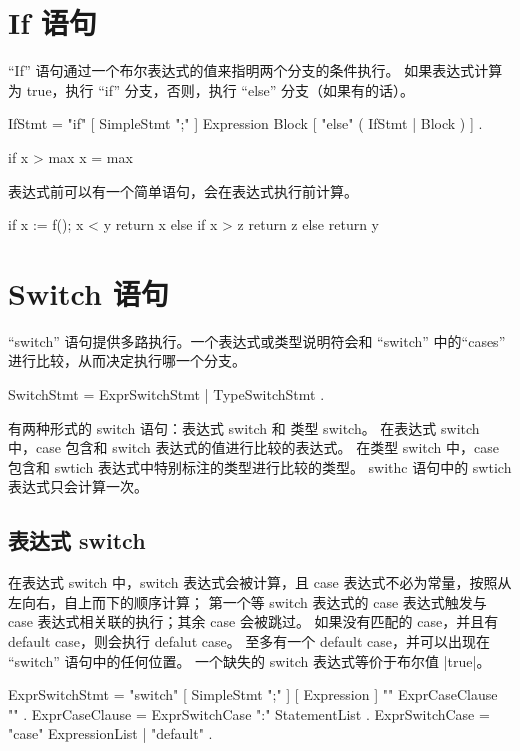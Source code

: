 \section{If 语句}
``If'' 语句通过一个布尔表达式的值来指明两个分支的条件执行。
如果表达式计算为 true，执行 ``if'' 分支，否则，执行 ``else'' 分支（如果有的话）。
\begin{EBNF}
IfStmt = "if" [ SimpleStmt ";" ] Expression Block [ "else" ( IfStmt | Block ) ] .
\end{EBNF}

\begin{golang}
if x > max {
	x = max
}
\end{golang}

表达式前可以有一个简单语句，会在表达式执行前计算。
\begin{golang}
if x := f(); x < y {
	return x
} else if x > z {
	return z
} else {
	return y
}
\end{golang}

\section{Switch 语句}
``switch'' 语句提供多路执行。一个表达式或类型说明符会和 ``switch'' 中的``cases'' 进行比较，从而决定执行哪一个分支。
\begin{EBNF}
SwitchStmt = ExprSwitchStmt | TypeSwitchStmt .
\end{EBNF}
有两种形式的 switch  语句：表达式 switch 和 类型 switch。
在表达式 switch 中，case 包含和 switch 表达式的值进行比较的表达式。
在类型 switch 中，case 包含和 swtich 表达式中特别标注的类型进行比较的类型。
swithc 语句中的 swtich 表达式只会计算一次。

\subsection{表达式 switch}
在表达式 switch 中，switch 表达式会被计算，且 case 表达式不必为常量，按照从左向右，自上而下的顺序计算；
第一个等 switch 表达式的 case 表达式触发与 case 表达式相关联的执行；其余 case 会被跳过。
如果没有匹配的 case，并且有 default case，则会执行  defalut case。
至多有一个 default case，并可以出现在 ``switch'' 语句中的任何位置。
一个缺失的 switch 表达式等价于布尔值 \code|true|。
\begin{EBNF}
ExprSwitchStmt = "switch" [ SimpleStmt ";" ] [ Expression ] "{" { ExprCaseClause } "}" .
ExprCaseClause = ExprSwitchCase ":" StatementList .
ExprSwitchCase = "case" ExpressionList | "default" .
\end{EBNF}

